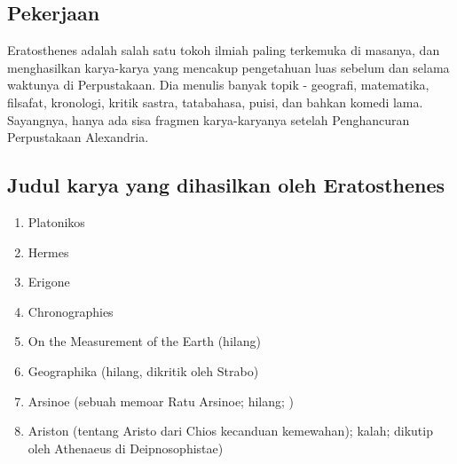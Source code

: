 \subsection{Pekerjaan}
Eratosthenes adalah salah satu tokoh ilmiah paling terkemuka di masanya, dan menghasilkan karya-karya yang mencakup pengetahuan luas sebelum dan selama waktunya di Perpustakaan. Dia menulis banyak topik - geografi, matematika, filsafat, kronologi, kritik sastra, tatabahasa, puisi, dan bahkan komedi lama. Sayangnya, hanya ada sisa fragmen karya-karyanya setelah Penghancuran Perpustakaan Alexandria.

\subsection{Judul karya yang dihasilkan oleh Eratosthenes}
\begin{enumerate}
\item	Platonikos
\item	Hermes
\item	Erigone
\item	Chronographies
\item	On the Measurement of the Earth (hilang)
\item	Geographika (hilang, dikritik oleh Strabo)
\item	Arsinoe (sebuah memoar Ratu Arsinoe; hilang; \cite{gulickathenaeus})
\item	Ariston (tentang Aristo dari Chios kecanduan kemewahan); kalah; dikutip oleh Athenaeus di Deipnosophistae) \cite{gulickathenaeus}
\end{enumerate}

